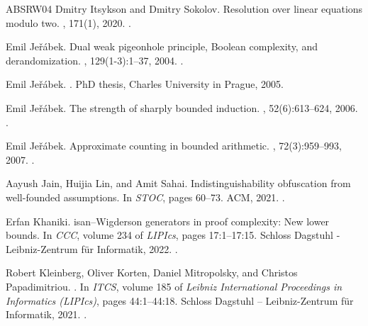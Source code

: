\documentclass[10pt,a4paper]{article}
\theoremstyle{definition}
\theoremstyle{remark}
\begin{document}
\begin{thebibliography}{ABSRW04}
Dmitry Itsykson and Dmitry Sokolov.
\newblock Resolution over linear equations modulo two.
, 171(1), 2020.
\newblock \href {https://doi.org/10.1016/J.APAL.2019.102722}
  {}.

Emil Je{\v{r}}{\'{a}}bek.
\newblock Dual weak pigeonhole principle, {B}oolean complexity, and
  derandomization.
, 129(1-3):1--37, 2004.
\newblock \href {https://doi.org/10.1016/J.APAL.2003.12.003}
  {}.

Emil Je{\v{r}}{\'{a}}bek.
.
\newblock PhD thesis, Charles University in Prague, 2005.

Emil Je{\v{r}}{\'{a}}bek.
\newblock The strength of sharply bounded induction.
, 52(6):613--624, 2006.
\newblock \href {https://doi.org/10.1002/MALQ.200610019}
  {}.

Emil Je{\v{r}}{\'{a}}bek.
\newblock Approximate counting in bounded arithmetic.
, 72(3):959--993, 2007.
\newblock \href {https://doi.org/10.2178/JSL/1191333850}
  {}.

Aayush Jain, Huijia Lin, and Amit Sahai.
\newblock Indistinguishability obfuscation from well-founded assumptions.
\newblock In {\em {STOC}}, pages 60--73. {ACM}, 2021.
\newblock \href {https://doi.org/10.1145/3406325.3451093}
  {}.

Erfan Khaniki.
isan--{W}igderson generators in proof complexity: New lower
  bounds.
\newblock In {\em {CCC}}, volume 234 of {\em LIPIcs}, pages 17:1--17:15.
  Schloss Dagstuhl - Leibniz-Zentrum f{\"{u}}r Informatik, 2022.
\newblock \href {https://doi.org/10.4230/LIPICS.CCC.2022.17}
  {}.

Robert Kleinberg, Oliver Korten, Daniel Mitropolsky, and Christos
  Papadimitriou.
.
\newblock In {\em {ITCS}}, volume 185 of {\em Leibniz International Proceedings
  in Informatics (LIPIcs)}, pages 44:1--44:18. Schloss Dagstuhl --
  Leibniz-Zentrum f{\"u}r Informatik, 2021.
\newblock \href {https://doi.org/10.4230/LIPIcs.ITCS.2021.44}
  {}.


\end{thebibliography}
\end{document}
